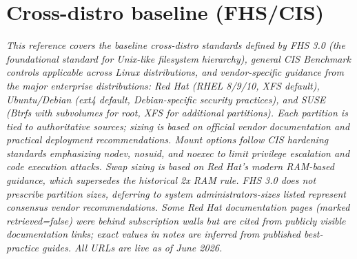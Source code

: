 \documentclass[10pt,a4paper]{article}
\begin{document}
\section{Cross-distro baseline (FHS/CIS)}
\noindent\small\textit{This reference covers the baseline cross-distro standards defined by FHS 3.0 (the foundational standard for Unix-like filesystem hierarchy), general CIS Benchmark controls applicable across Linux distributions, and vendor-specific guidance from the major enterprise distributions: Red Hat (RHEL 8/9/10, XFS default), Ubuntu/Debian (ext4 default, Debian-specific security practices), and SUSE (Btrfs with subvolumes for root, XFS for additional partitions). Each partition is tied to authoritative sources; sizing is based on official vendor documentation and practical deployment recommendations. Mount options follow CIS hardening standards emphasizing nodev, nosuid, and noexec to limit privilege escalation and code execution attacks. Swap sizing is based on Red Hat's modern RAM-based guidance, which supersedes the historical 2x RAM rule. FHS 3.0 does not prescribe partition sizes, deferring to system administrators-sizes listed represent consensus vendor recommendations. Some Red Hat documentation pages (marked retrieved=false) were behind subscription walls but are cited from publicly visible documentation links; exact values in notes are inferred from published best-practice guides. All URLs are live as of June 2026.}\normalsize\par\medskip
\end{document}
